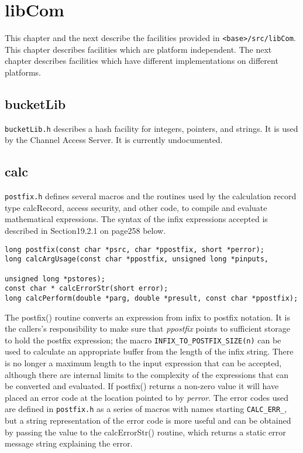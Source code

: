 





\chapter{libCom}

This chapter and the next describe the facilities provided in \verb|<base>/src/libCom|. This chapter describes facilities 
which are platform independent. The next chapter describes facilities which have different implementations on different 
platforms.

\section{bucketLib}

\verb|bucketLib.h| describes a hash facility for integers, pointers, and strings. It is used by the Channel Access Server. It is 
currently undocumented.

\section{calc}

\verb|postfix.h| defines several macros and the routines used by the calculation record type calcRecord, access security, and 
other code, to compile and evaluate mathematical expressions. The syntax of the infix expressions accepted is described 
in Section19.2.1 on page258 below.

\begin{verbatim}long postfix(const char *psrc, char *ppostfix, short *perror);
long calcArgUsage(const char *ppostfix, unsigned long *pinputs, 

unsigned long *pstores);
const char * calcErrorStr(short error);
long calcPerform(double *parg, double *presult, const char *ppostfix);
\end{verbatim}
The postfix() routine converts an expression from infix to postfix notation. It is the callers's responsibility to make sure 
that \emph{ppostfix} points to sufficient storage to hold the postfix expression; the macro \verb|INFIX_TO_POSTFIX_SIZE(n)| can 
be used to calculate an appropriate buffer from the length of the infix string. There is no longer a maximum length to the 
input expression that can be accepted, although there are internal limits to the complexity of the expressions that can be 
converted and evaluated. If postfix() returns a non-zero value it will have placed an error code at the location pointed to 
by \emph{perror}. The error codes used are defined in \verb|postfix.h| as a series of macros with names starting \verb|CALC_ERR_|, but a 
string representation of the error code is more useful and can be obtained by passing the value to the calcErrorStr() 
routine, which returns a static error message string explaining the error.

